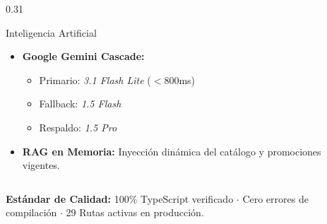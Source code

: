 \documentclass[aspectratio=169, 10pt]{beamer}
\begin{document}
\begin{frame}
\begin{columns}[T]
    \begin{column}{0.31\textwidth}
      \begin{exampleblock}{Inteligencia Artificial}
        \scriptsize
        \begin{itemize}\setlength\itemsep{0.25em}
          \item \textbf{Google Gemini Cascade:}
          \begin{itemize}\scriptsize
            \item Primario: \textit{3.1 Flash Lite} ($<$800ms)
            \item Fallback: \textit{1.5 Flash}
            \item Respaldo: \textit{1.5 Pro}
          \end{itemize}
          \item \textbf{RAG en Memoria:} Inyección dinámica del catálogo y promociones vigentes.
        \end{itemize}
      \end{exampleblock}
    \end{column}
  \end{columns}

  \vskip 0.25cm
  \centering \scriptsize \color{AranjuezMuted}
  \textbf{Estándar de Calidad:} 100\% TypeScript verificado $\cdot$ Cero errores de compilación $\cdot$ 29 Rutas activas en producción.
\end{frame}
\end{document}
